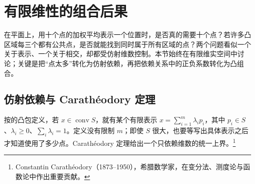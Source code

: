 
% 
% 

\section{有限维性的组合后果}
\label{g1:sec:0302}

在平面上，用十个点的加权平均表示一个位置时，是否真的需要十个点？若许多凸区域每三个都有公共点，是否就能找到同时属于所有区域的点？两个问题看似一个关于表示、一个关于相交，却都受仿射维数控制。本节始终在有限维实空间中讨论；关键是把“点太多”转化为仿射依赖，再把依赖关系中的正负系数转化为凸组合。

\subsection{仿射依赖与 Carathéodory 定理}
\label{g1:subsec:0302:01}

按的凸包定义，若 \(x\in\operatorname{conv}S\)，就有某个有限表示 \(x=\sum_{i=1}^m\lambda_i p_i\)，其中 \(p_i\in S\)、\(\lambda_i\ge0\)、\(\sum_i\lambda_i=1\)。定义没有限制 \(m\)；即使 \(S\) 很大，也要等写出具体表示之后才知道使用了多少点。Carathéodory 定理给出一个只依赖维数的统一上界。\footnote{Constantin Carathéodory（1873--1950），希腊数学家，在变分法、测度论与函数论中作出重要贡献。}

